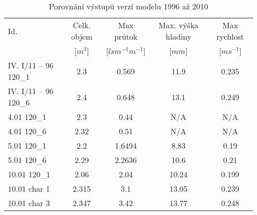 \begin{table}[htbp]
  \centering
  \caption{Porovnání výstupů verzí modelu 1996 až 2010}
    \begin{tabular}{lcccc}
    \hline 
      Id.    & Celk. objem & Max průtok & Max. výška hladiny & Max rychlost \\
          & [$m^{3}$]  & [$lsm^{-1}m^{-1}$] & [$mm$]  & [$ms^{-1}$] \\
    \hline
    \hline 
    IV. I/11 – 96 120\_1 & 2.3   & 0.569 & 11.9  & 0.235 \\

    IV. I/11 – 96 120\_6 & 2.4   & 0.648 & 13.1  & 0.249 \\

    4.01 120\_1 & 2.3   & 0.44  &  N/A    &  N/A\\

    4.01 120\_6 & 2.32  & 0.51  &  N/A     &  N/A\\

    5.01 120\_1 & 2.2   & 1.6494 & 8.83  & 0.19 \\

    5.01 120\_6 & 2.29  & 2.2636 & 10.6  & 0.21 \\

    10.01 120\_1 & 2.06  & 2.04  & 10.24 & 0.199 \\

    10.01 char 1 & 2.315 & 3.1   & 13.05 & 0.239 \\

    10.01 char 3 & 2.347 & 3.42  & 13.77 & 0.248 \\
    \hline
    \end{tabular}%
  \label{tab:addlabel}%
\end{table} 